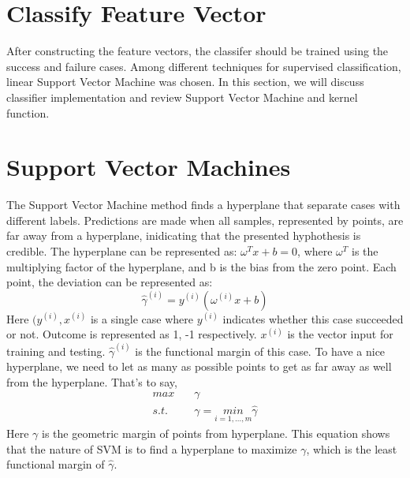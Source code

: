 \section{Classify Feature Vector}
After constructing the feature vectors, the classifer should be trained using the success and failure cases. Among different techniques for supervised classification, linear Support Vector Machine was chosen. In this section, we will discuss classifier implementation and review Support Vector Machine and kernel function.\\
\section{Support Vector Machines}
The Support Vector Machine method finds a hyperplane that separate cases with different labels. Predictions are made when all samples, represented by points, are far away from a hyperplane, inidicating that the presented hyphothesis is credible. The hyperplane can be represented as: $\omega^{T}x + b = 0$, where $\omega^{T}$ is the multiplying factor of the hyperplane, and b is the bias from the zero point. Each point, the deviation can be represented as: \\
\begin{equation}
    \hat{\gamma}^{(i)}=y^{(i)}(\omega^{(i)}x+b)
\end{equation}
Here $(y^{(i)}, x^{(i)}$ is a single case where $y^{(i)}$ indicates whether this case succeeded or not. Outcome is represented as  {1, -1} respectively. $x^{(i)}$ is the vector input for training and testing. $\hat{\gamma}^{(i)}$ is the functional margin of this case. To have a nice hyperplane, we need to let as many as possible points to get as far away as well from the hyperplane. That's to say,
\begin{equation}
    \begin{split}
        max\quad&\gamma \nonumber \\
        s.t.\quad&\gamma = \underset{i = 1,\ldots,m}{min}\hat{\gamma}
    \end{split}
\end{equation}
Here $\gamma$ is the geometric margin of points from hyperplane. This equation shows that the nature of SVM is to find a hyperplane to maximize $\gamma$, which is the least functional margin of $\hat{\gamma}$.
